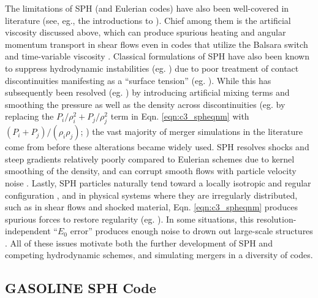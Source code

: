 The limitations of SPH (and Eulerian codes) have also been well-covered in literature (see, eg., the introductions to \citealt{spri10, hopk15, katz+16}).  Chief among them is the artificial viscosity discussed above, which can produce spurious heating and angular momentum transport in shear flows even in codes that utilize the Balsara switch and time-variable viscosity \citep{culld10}.  Classical formulations of SPH have also been known to suppress hydrodynamic instabilities (eg. \citealt{ager+07}) due to poor treatment of contact discontinuities manifesting as a ``surface tension'' (eg. \citealt{readha10, hesss10}).  While this has subsequently been resolved (eg. \citealt{hopk13, hu+14, kell+14}) by introducing artificial mixing terms \citep{pric08} and smoothing the pressure as well as the density across discontinuities (eg. by replacing the $P_i/\rho_i^2 + P_j/\rho_j^2$ term in Eqn. \ref{eqn:c3_spheqnm} with $(P_i + P_j)/(\rho_i\rho_j)$; \citealt{kell+14}) the vast majority of merger simulations in the literature come from before these alterations became widely used.  SPH resolves shocks and steep gradients relatively poorly compared to Eulerian schemes due to kernel smoothing of the density, and can corrupt smooth flows with particle velocity noise \citep{spri10rev}.  Lastly, SPH particles naturally tend toward a locally isotropic and regular configuration \citep{pric12}, and in physical systems where they are irregularly distributed, such as in shear flows and shocked material, Eqn. \ref{eqn:c3_spheqnm} produces spurious forces to restore regularity (eg. \citealt{readha10, dehna12}).  In some situations, this resolution-independent ``$E_0$ error'' produces enough noise to drown out large-scale structures \citep{hopk15}.  All of these issues motivate both the further development of SPH and competing hydrodynamic schemes, and simulating mergers in a diversity of codes.


\subsection{GASOLINE SPH Code}
\label{ssec:c3_gasoline}

